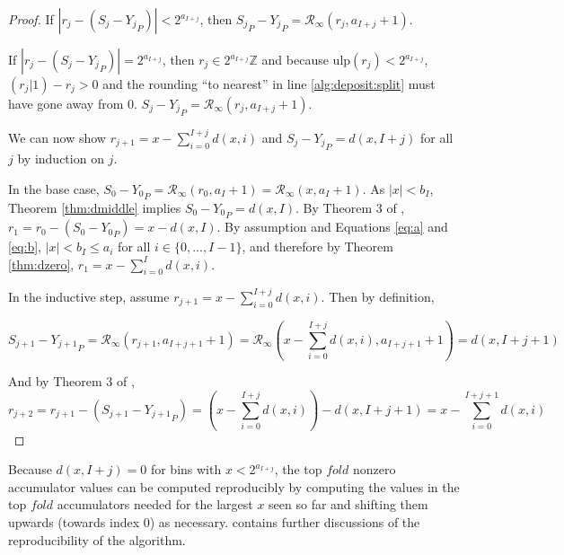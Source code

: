 \documentclass[12pt]{article}
\providecommand{\Z}{\ensuremath{\mathbb{Z}}}
\providecommand{\ulp}{\ensuremath{\text{ulp}}}
\providecommand{\roundtonearestinfty}{\ensuremath{\mathcal{R}_\text{$\infty$}}}
\theoremstyle{plain}
\numberwithin{equation}{section}
\begin{document}
\begin{proof}
        If $|r_j - (S_j - {Y_j}_P)| < 2^{a_{I + j}}$, then ${S_j}_P - {Y_j}_P = \roundtonearestinfty(r_j, a_{I + j} + 1)$.

        If $|r_j - (S_j - {Y_j}_P)| = 2^{a_{I + j}}$, then $r_j \in 2^{a_{I + j}}\Z$ and because $\ulp(r_j) < 2^{a_{I + j}}$, $(r_j | 1) - r_j > 0$ and the rounding ``to nearest'' in line \ref{alg:deposit:split} must have gone away from 0. $S_j - {Y_j}_P = \roundtonearestinfty(r_j, a_{I + j} + 1)$.

        We can now show $r_{j + 1} = x - \sum\limits_{i = 0}^{I + j}d(x, i)$ and $S_j - {Y_j}_P = d(x, I + j)$ for all $j$ by induction on $j$.

        In the base case, $S_0 - {Y_0}_P = \roundtonearestinfty(r_0, a_I + 1) = \roundtonearestinfty(x, a_I + 1)$. As $|x| < b_I$, Theorem \ref{thm:dmiddle} implies $S_0 - {Y_0}_P = d(x, I)$. By Theorem 3 of \cite{repsum}, $r_1 = r_0 - (S_0 - {Y_0}_P) = x - d(x,I)$. By assumption and Equations \ref{eq:a} and \ref{eq:b}, $|x| < b_I \leq a_{i}$ for all $i \in \{0, ..., I - 1\}$, and therefore by Theorem \ref{thm:dzero}, $r_1 = x - \sum\limits_{i = 0}^Id(x, i)$.

        In the inductive step, assume $r_{j + 1} = x - \sum\limits_{i = 0}^{I + j}d(x, i)$. Then by definition,

        \begin{equation*}
          S_{j + 1} - {Y_{j + 1}}_P = \roundtonearestinfty(r_{j + 1}, a_{I + j + 1} + 1) = \roundtonearestinfty(x - \sum\limits_{i = 0}^{I + j}d(x, i), a_{I + j + 1} + 1) = d(x, I + j + 1)
        \end{equation*}

        And by Theorem 3 of \cite{repsum},
        \begin{equation*}
          r_{j + 2} = r_{j + 1} - (S_{j + 1} - {Y_{j + 1}}_P) = (x - \sum\limits_{i = 0}^{I + j}d(x, i)) - d(x, I + j + 1) = x - \sum\limits_{i = 0}^{I + j + 1}d(x, i)
        \end{equation*}
      \end{proof}

      Because $d(x, I + j) = 0$ for bins with $x < 2^{a_{I + j}}$, the top $fold$ nonzero accumulator values can be computed reproducibly by computing the values in the top $fold$ accumulators needed for the largest $x$ seen so far and shifting them upwards (towards index $0$) as necessary. \cite{repsum} contains further discussions of the reproducibility of the algorithm.
\end{document}
